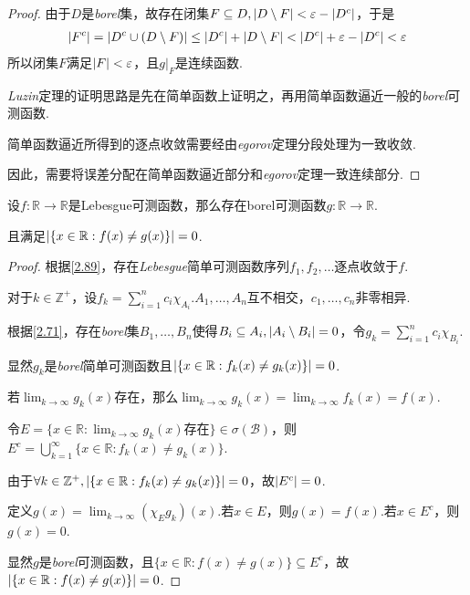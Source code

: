 \begin{proof}
    由于\(D\)是\textit{borel}集，故存在闭集\(F \subseteq D, \abs*{D \setminus F}<\varepsilon-\abs*{D^c}\)，于是
    \begin{align*}
        \abs*{F^c}=\abs*{D^c \cup (D \setminus F)} \leq \abs*{D^c}+\abs*{D \setminus F}<\abs*{D^c}+\varepsilon-\abs*{D^c}<\varepsilon 
    \end{align*}
    所以闭集\(F\)满足\(\abs*{F}<\varepsilon\)，且\(\left.g\right|_F\)是连续函数.

    {\kaishu \textit{Luzin}定理的证明思路是先在简单函数上证明之，再用简单函数逼近一般的\textit{borel}可测函数.
    
    简单函数逼近所得到的逐点收敛需要经由\textit{egorov}定理分段处理为一致收敛.
    
    因此，需要将误差分配在简单函数逼近部分和\textit{egorov}定理一致连续部分.}
\end{proof}

\newpage

\begin{theorem}[2.95]\label{2.95}
    设\(f: \mathbb{R} \to \mathbb{R}\)是Lebesgue可测函数，那么存在borel可测函数\(g: \mathbb{R} \to \mathbb{R}\).

    且满足\(\abs*{\{x \in \mathbb{R}: f(x) \ne g(x)\}}=0\).
\end{theorem}

\begin{proof}
    根据\cref{2.89}，存在\textit{Lebesgue}简单可测函数序列\(f_1, f_2, \dots\)逐点收敛于\(f\).

    对于\(k \in \mathbb{Z}^+\)，设\(f_k=\sum_{i=1}^n c_i \chi_{A_i}\).\(A_1, \dots, A_n\)互不相交，\(c_1, \dots, c_n\)非零相异.

    根据\cref{2.71}，存在\textit{borel}集\(B_1, \dots, B_n\)使得\(B_i \subseteq A_i, \abs*{A_i \setminus B_i}=0\)，令\(g_k=\sum_{i=1}^n c_i \chi_{B_i}\).

    显然\(g_k\)是\textit{borel}简单可测函数且\(\abs*{\{x \in \mathbb{R}: f_k(x) \ne g_k(x)\}}=0\).

    若\(\lim_{k \to \infty}g_k(x)\)存在，那么\(\lim_{k \to \infty}g_k(x)=\lim_{k \to \infty}f_k(x)=f(x)\).

    令\(E=\{x \in \mathbb{R}: \lim_{k \to \infty}g_k(x)\text{存在}\} \in \sigma(\mathcal{B})\)，则\(E^c=\bigcup_{k=1}^\infty \{x \in \mathbb{R}: f_k(x) \ne g_k(x)\}\).

    由于\(\forall k \in \mathbb{Z}^+, \abs*{\{x \in \mathbb{R}: f_k(x) \ne g_k(x)\}}=0\)，故\(\abs*{E^c}=0\).

    定义\(g(x)=\lim_{k \to \infty}(\chi_E g_k)(x)\).若\(x \in E\)，则\(g(x)=f(x)\).若\(x \in E^c\)，则\(g(x)=0\).

    显然\(g\)是\textit{borel}可测函数，且\(\{x \in \mathbb{R}: f(x) \ne g(x)\} \subseteq E^c\)，故\(\abs*{\{x \in \mathbb{R}: f(x) \ne g(x)\}}=0\).
\end{proof}


